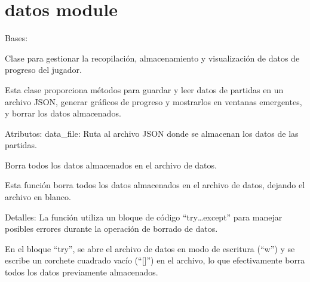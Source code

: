 \documentclass[letterpaper,10pt,spanish]{sphinxmanual}
\begin{document}
\sphinxstepscope


\chapter{datos module}
\label{\detokenize{datos:module-datos}}\label{\detokenize{datos:datos-module}}\label{\detokenize{datos::doc}}

\begin{fulllineitems}
\label{\detokenize{datos:datos.GestionDatos}}
\pysigstartsignatures
{}
\pysigstopsignatures
\sphinxAtStartPar
Bases: 

\sphinxAtStartPar
Clase para gestionar la recopilación, almacenamiento y visualización de datos de progreso del jugador.

\sphinxAtStartPar
Esta clase proporciona métodos para guardar y leer datos de partidas en un archivo JSON,
generar gráficos de progreso y mostrarlos en ventanas emergentes, y borrar los datos almacenados.

\sphinxAtStartPar
Atributos:
data\_file: Ruta al archivo JSON donde se almacenan los datos de las partidas.

\begin{fulllineitems}
\label{\detokenize{datos:datos.GestionDatos.borrar_datos}}
\pysigstartsignatures
{}
\pysigstopsignatures
\sphinxAtStartPar
Borra todos los datos almacenados en el archivo de datos.

\sphinxAtStartPar
Esta función borra todos los datos almacenados en el archivo de datos, dejando el archivo en blanco.

\sphinxAtStartPar
Detalles:
La función utiliza un bloque de código “try…except” para manejar posibles errores durante la operación
de borrado de datos.

\sphinxAtStartPar
En el bloque “try”, se abre el archivo de datos en modo de escritura (“w”) y se escribe un corchete
cuadrado vacío (“{[}{]}”) en el archivo, lo que efectivamente borra todos los datos previamente almacenados.


\end{fulllineitems}
\end{fulllineitems}
\end{document}
